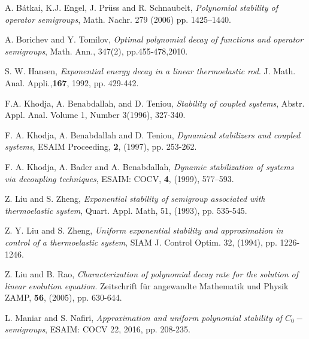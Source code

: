 \documentclass [reqno]{amsart}
\begin{document}
\begin{thebibliography}{00}

 A. B\' atkai, K.J. Engel, J. Pr\"uss and R. Schnaubelt, \textit{Polynomial stability of operator semigroups}, Math. Nachr. 279 (2006) pp. 1425–1440.

 A. Borichev and Y. Tomilov, \textit{Optimal polynomial decay of functions and operator semigroups}, Math. Ann., 347(2), pp.455-478,2010.


 S. W. Hansen, \textit{Exponential energy decay in a linear thermoelastic rod}. J. Math. Anal. Appli.,\textbf{167}, 1992, pp. 429-442.

 F.A. Khodja, A. Benabdallah, and D. Teniou, \textit{Stability of coupled systems}, Abstr. Appl. Anal. Volume 1, Number 3(1996), 327-340.

 F. A. Khodja, A. Benabdallah and D. Teniou, \textit{Dynamical stabilizers and coupled systems}, ESAIM Proceeding, \textbf{2}, (1997), pp. 253-262.

 F. A. Khodja, A. Bader and A. Benabdallah, \textit{Dynamic stabilization of systems via decoupling techniques}, ESAIM: COCV, \textbf{4}, (1999), 577–593.

 Z. Liu and S. Zheng, \textit{Exponential stability of semigroup associated with thermoelastic system}, Quart. Appl. Math, 51, (1993), pp. 535-545.

 Z. Y. Liu and S. Zheng, \textit{Uniform exponential stability and approximation in control of a thermoelastic system}, SIAM J. Control Optim. 32, (1994), pp.
1226-1246.

 Z. Liu and B. Rao, \textit{Characterization of polynomial decay rate for the solution of linear evolution equation}. Zeitschrift f\"ur angewandte Mathematik und Physik ZAMP, \textbf{56}, (2005), pp. 630-644.

 L. Maniar and S. Nafiri, \textit{Approximation and uniform polynomial stability of $C_0-$semigroups}, ESAIM: COCV 22, 2016, pp. 208-235.

\end{thebibliography}
\end{document}
